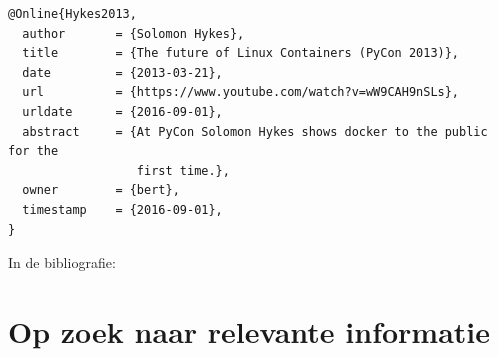 \begin{verbatim}
@Online{Hykes2013,
  author       = {Solomon Hykes},
  title        = {The future of Linux Containers (PyCon 2013)},
  date         = {2013-03-21},
  url          = {https://www.youtube.com/watch?v=wW9CAH9nSLs},
  urldate      = {2016-09-01},
  abstract     = {At PyCon Solomon Hykes shows docker to the public for the
                  first time.},
  owner        = {bert},
  timestamp    = {2016-09-01},
}
\end{verbatim}

In de bibliografie: 

\section{Op zoek naar relevante informatie}
\label{sec:op_zoek_naar_relevante_informatie}

